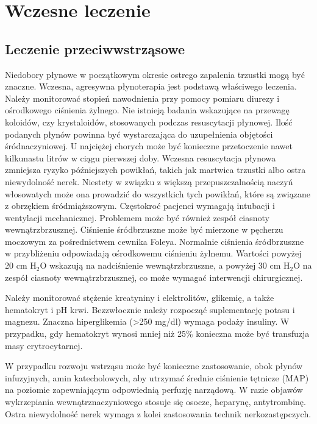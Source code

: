 \documentclass[a4paper, 12pt]{report}
\begin{document}
\section{Wczesne leczenie}

\subsection{Leczenie przeciwwstrząsowe}

Niedobory płynowe w początkowym okresie ostrego zapalenia trzustki
mogą być znaczne. Wczesna, agresywna płynoterapia jest podstawą
właściwego leczenia. Należy monitorować stopień nawodnienia przy
pomocy pomiaru diurezy i ośrodkowego ciśnienia żylnego. Nie istnieją
badania wskazujące na przewagę koloidów, czy krystaloidów, stosowanych
podczas resuscytacji płynowej. Ilość podanych płynów powinna być
wystarczająca do uzupełnienia objętości śródnaczyniowej. U najciężej
chorych może być konieczne przetoczenie nawet kilkunastu litrów w
ciągu pierwszej doby. Wczesna resuscytacja płynowa zmniejsza ryzyko
późniejszych powikłań, takich jak martwica trzustki albo ostra
niewydolność nerek. Niestety w związku z większą przepuszczalnością
naczyń włosowatych może ona prowadzić do wszystkich tych powikłań,
które są związane z obrzękiem śródmiąższowym. Częstokroć pacjenci
wymagają intubacji i wentylacji mechanicznej. Problemem może być
również zespół ciasnoty wewnątrzbrzusznej. Ciśnienie śródbrzuszne może
być mierzone w pęcherzu moczowym za pośrednictwem cewnika
Foleya. Normalnie ciśnienia śródbrzuszne w przybliżeniu odpowiadają
ośrodkowemu ciśnieniu żylnemu. Wartości powyżej 20 cm H$_2$O wskazują
na nadciśnienie wewnątrzbrzuszne, a powyżej 30 cm H$_2$O na zespół
ciasnoty wewnątrzbrzusznej, co może wymagać interwencji chirurgicznej.

Należy monitorować stężenie kreatyniny i elektrolitów, glikemię, a
także hematokryt i pH krwi. Bezzwłocznie należy rozpocząć
suplementację potasu i magnezu. Znaczna hiperglikemia (>250 mg/dl) wymaga podaży
insuliny. W przypadku, gdy hematokryt wynosi mniej niż 25\% konieczna
może być transfuzja masy erytrocytarnej.

W przypadku rozwoju wstrząsu może być konieczne zastosowanie, obok
płynów infuzyjnych, amin katecholowych, aby utrzymać średnie ciśnienie
tętnicze (MAP) na poziomie zapewniającym odpowiednią perfuzję
narządową. W razie objawów wykrzepiania wewnątrznaczyniowego stosuje
się osocze, heparynę, antytrombinę. Ostra niewydolność nerek wymaga z
kolei zastosowania technik nerkozastępczych.
\end{document}
